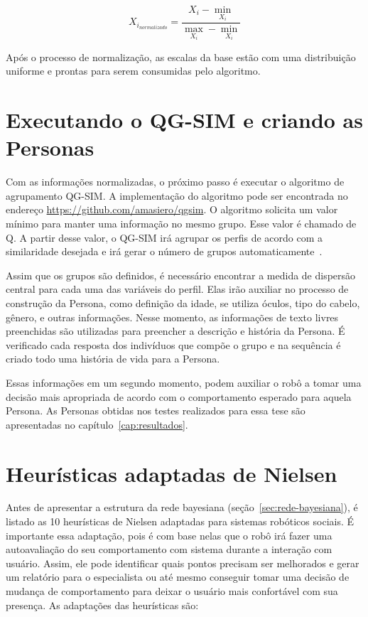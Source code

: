 \begin{equation}
	X_{i_{normalizado}} = \frac{X_i - \min_{X_i}}{\max_{X_i} - \min_{X_i}}
	\label{eq:normalizacao2}
\end{equation}

Após o processo de normalização, as escalas da base estão com uma distribuição uniforme e prontas para serem consumidas pelo algoritmo.

\section{Executando o QG-SIM e criando as Personas}
\label{sec:criarpersonas}
Com as informações normalizadas, o próximo passo é executar o algoritmo de agrupamento QG-SIM. A implementação do algoritmo pode ser encontrada no endereço \url{https://github.com/amasiero/qgsim}. O algoritmo solicita um valor mínimo para manter uma informação no mesmo grupo. Esse valor é chamado de Q. A partir desse valor, o QG-SIM irá agrupar os perfis de acordo com a similaridade desejada e irá gerar o número de grupos automaticamente~\cite{masiero:2013}.

Assim que os grupos são definidos, é necessário encontrar a medida de dispersão central para cada uma das variáveis do perfil. Elas irão auxiliar no processo de construção da Persona, como definição da idade, se utiliza óculos, tipo do cabelo, gênero, e outras informações. Nesse momento, as informações de texto livres preenchidas são utilizadas para preencher a descrição e história da Persona. É verificado cada resposta dos indivíduos que compõe o grupo e na sequência é criado todo uma história de vida para a Persona.

Essas informações em um segundo momento, podem auxiliar o robô a tomar uma decisão mais apropriada de acordo com o comportamento esperado para aquela Persona. As Personas obtidas nos testes realizados para essa tese são apresentadas no capítulo~\ref{cap:resultados}.

\section{Heurísticas adaptadas de Nielsen}
\label{sec:heuristicas}
Antes de apresentar a estrutura da rede bayesiana (seção~\ref{sec:rede-bayesiana}), é listado as 10 heurísticas de Nielsen adaptadas para sistemas robóticos sociais. É importante essa adaptação, pois é com base nelas que o robô irá fazer uma autoavaliação do seu comportamento com sistema durante a interação com usuário. Assim, ele pode identificar quais pontos precisam ser melhorados e gerar um relatório para o especialista ou até mesmo conseguir tomar uma decisão de mudança de comportamento para deixar o usuário mais confortável com sua presença. As adaptações das heurísticas são:

